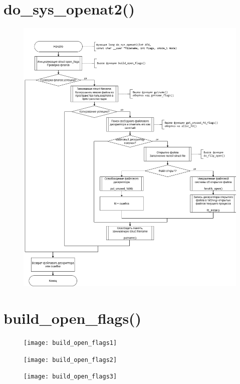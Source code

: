 \documentclass[12pt]{report}
\begin{document}
	\section{do\_sys\_openat2()}
	\begin{figure}[H]
		\centering
		\includegraphics[scale=0.55]{do_sys_openat2}
	\end{figure}
	
	
	
	\section{build\_open\_flags()}
	
	
	\begin{figure}[H]
		\centering
		\texttt{[image: build\_open\_flags1]}
	\end{figure}

	\begin{figure}[H]
	\centering
	\texttt{[image: build\_open\_flags2]}
	\end{figure}
	
	\begin{figure}[H]
		\centering
		\texttt{[image: build\_open\_flags3]}
	\end{figure}
	
\end{document}
